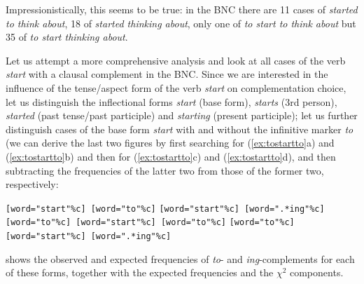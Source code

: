 Impressionistically, this seems to be true: in the BNC  there are 11 cases of \textit{started to think about}, 18 of \textit{started thinking about}, only one of \textit{to start to think about} but 35 of \textit{to start thinking about}.

Let us attempt a more comprehensive analysis and look at all cases of the verb  \textit{start} with a clausal complement  in the BNC.  Since we are interested in the influence of the tense\slash aspect form of the verb \textit{start} on complementation choice, let us distinguish the inflectional forms \textit{start} (base form), \textit{starts} (3rd person), \textit{started} (past tense\slash past participle) and \textit{starting} (present participle); let us further distinguish cases of the base form \textit{start} with and without the infinitive marker \textit{to} (we can derive the last two figures by first searching for (\ref{ex:tostartto}a) and (\ref{ex:tostartto}b) and then for (\ref{ex:tostartto}c) and (\ref{ex:tostartto}d), and then subtracting the frequencies  of the latter two from those of the former two, respectively:

\begin{exe}
\ex
\begin{xlist}
\label{ex:tostartto}
\ex \texttt{[word="start"\%c] [word="to"\%c]}
\ex \texttt{[word="start"\%c] [word=".*ing"\%c]}
\ex \texttt{[word="to"\%c] [word="start"\%c] [word="to"\%c]}
\ex \texttt{[word="to"\%c] [word="start"\%c] [word=".*ing"\%c]}
\end{xlist}
\end{exe}

 shows the observed and expected  frequencies of \textit{to}- and \textit{ing}\hyp{}complements  for each of these forms, together with the expected frequencies and the $\chi^2$ components.

